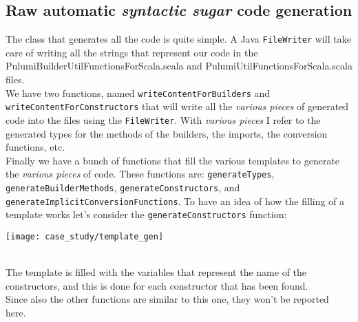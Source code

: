 \subsection{Raw automatic \textit{syntactic sugar} code generation}
The class that generates all the code is quite simple.
A Java \texttt{FileWriter} will take care of writing all the strings that represent our code in the PulumiBuilderUtilFunctionsForScala.scala and PulumiUtilFunctionsForScala.scala files.\\
We have two functions, named \texttt{writeContentForBuilders} and \texttt{writeContentForConstructors} that will write all the \textit{various pieces} of generated code into the files using the \texttt{FileWriter}.
With \textit{various pieces} I refer to the generated types for the methods of the builders, the imports, the conversion functions, etc.\\
Finally we have a bunch of functions that fill the various templates to generate the \textit{various pieces} of code.
These functions are: \texttt{generateTypes}, \texttt{generateBuilderMethods}, \texttt{generateConstructors}, and \texttt{generateImplicitConversionFunctions}.
To have an idea of how the filling of a template works let's consider the \texttt{generateConstructors} function:\\
\begin{center}
  \texttt{[image: case\_study/template\_gen]} 
\end{center}\mbox{}\\
The template is filled with the variables that represent the name of the constructors, and this is done for each constructor that has been found.\\
Since also the other functions are similar to this one, they won't be reported here.

